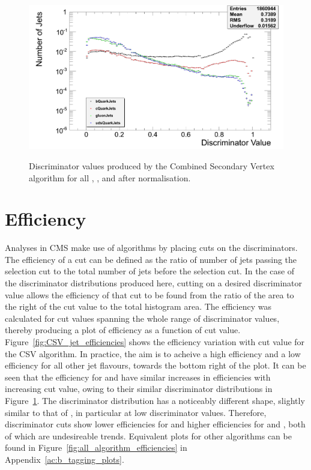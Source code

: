 \begin{figure}[hbtp]
   \centering
     \includegraphics[width=\textwidth]{Chapters/04_Analysis/04a_BTags/Images/CombinedSecondaryVertex_norm_discriminator_combined}\\
     \caption[Discriminator values produced by the Combined Secondary Vertex algorithm after
     normalisation.]{Discriminator values produced by the Combined Secondary Vertex algorithm for all \bjets,
     \cjets, \gjets and \udsjets after normalisation.}
     \label{fig:CSV_discriminators}
\end{figure}

\section{Efficiency}
\label{s:efficiency}

Analyses in CMS make use of \btagging algorithms by placing cuts on the discriminators. The efficiency of a
cut can be defined as the ratio of number of jets passing the selection cut to the total number of jets before
the selection cut. In the case of the discriminator distributions produced here, cutting on a desired
discriminator value allows the efficiency of that cut to be found from the ratio of the area to the right of
the cut value to the total histogram area. The efficiency was calculated for cut values spanning the whole
range of discriminator values, thereby producing a plot of \btag efficiency as a function of cut value.
Figure~\ref{fig:CSV_jet_efficiencies} shows the \btag efficiency variation with cut value for the CSV
algorithm. In practice, the aim is to acheive a high \bjet efficiency and a low efficiency for all other jet
flavours, \ie towards the bottom right of the plot. It can be seen that the efficiency for \udsjets and \gjets
have similar increases in efficiencies with increasing cut value, owing to their similar discriminator
distributions in Figure~\ref{fig:CSV_discriminators}. The \cjet discriminator distribution has a noticeably
different shape, slightly similar to that of \bjets, in particular at low discriminator values. Therefore,
discriminator cuts show lower efficiencies for \bjets and higher efficiencies for \udsjets and \gjets, both
of which are undesireable trends. Equivalent plots for other algorithms can be found in
Figure~\ref{fig:all_algorithm_efficiencies} in Appendix~\ref{ac:b_tagging_plots}.

